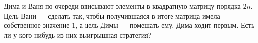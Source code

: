 \documentclass{article}
\begin{document}
Дима и Ваня по очереди вписывают элементы в квадратную матрицу порядка $2n$. Цель Вани --- сделать так, чтобы получившаяся в итоге
матрица имела собственное значение $1$, а цель Димы --- помешать ему. Дима ходит первым. Есть ли у кого-нибудь из них выигрышная стратегия?
\end{document}
